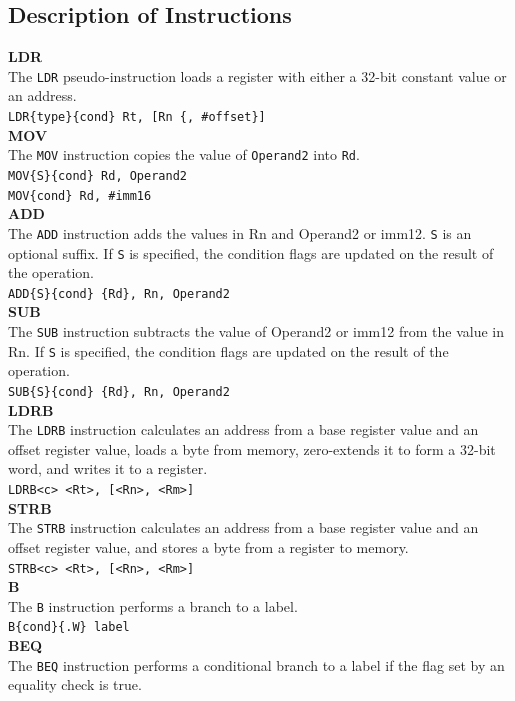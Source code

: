\documentclass[footheight=20pt, footsepline, headheight=20pt, headsepline]{scrartcl}
\begin{document}
\subsection*{Description of Instructions}
\textbf{LDR}\\
The \verb|LDR| pseudo-instruction loads a register with either a 32-bit constant value or an address.\\
\verb|LDR{type}{cond} Rt, [Rn {, #offset}]| \\
\textbf{MOV}\\
The \verb|MOV| instruction copies the value of \verb|Operand2| into \verb|Rd|.\\
\verb|MOV{S}{cond} Rd, Operand2|\\
\verb|MOV{cond} Rd, #imm16|\\
\textbf{ADD}\\
The \verb|ADD| instruction adds the values in Rn and Operand2 or imm12. \verb|S| is an optional suffix. If \verb|S| is specified, the condition flags are updated on the result of the operation.\\
\verb|ADD{S}{cond} {Rd}, Rn, Operand2|\\
\textbf{SUB}\\
The \verb|SUB| instruction subtracts the value of Operand2 or imm12 from the value in Rn. If \verb|S| is specified, the condition flags are updated on the result of the operation.\\
\verb|SUB{S}{cond} {Rd}, Rn, Operand2|\\
\textbf{LDRB}\\
The \verb|LDRB| instruction calculates an address from a base register value and an offset register value, loads a byte from memory, zero-extends it to form a 32-bit word, and writes it to a register. \\
\verb|LDRB<c> <Rt>, [<Rn>, <Rm>]|\\
\textbf{STRB}\\
The \verb|STRB| instruction calculates an address from a base register value and an offset register value, and stores a byte from a register to memory. \\
\verb|STRB<c> <Rt>, [<Rn>, <Rm>]|\\
\textbf{B}\\
The \verb|B| instruction performs a branch to a label.\\
\verb|B{cond}{.W} label|\\
\textbf{BEQ}\\
The \verb|BEQ| instruction performs a conditional branch to a label if the flag set by an equality check is true.\\
\end{document}
